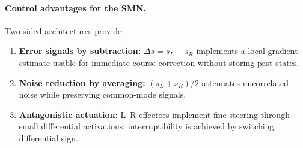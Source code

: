 \paragraph{Control advantages for the SMN.}
Two-sided architectures provide:
\begin{enumerate}
  \item \textbf{Error signals by subtraction:} $\Delta s = s_L - s_R$ implements a local gradient estimate usable for immediate course correction without storing past states.
  \item \textbf{Noise reduction by averaging:} $(s_L+s_R)/2$ attenuates uncorrelated noise while preserving common-mode signals.
  \item \textbf{Antagonistic actuation:} L--R effectors implement fine steering through small differential activations; interruptibility is achieved by switching differential sign.
\end{enumerate}



